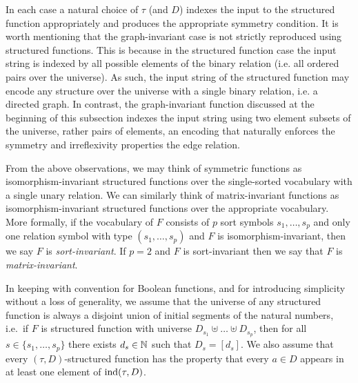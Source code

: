\documentclass[../paper.tex]{subfiles}
\begin{document}
In each case a natural choice of $\tau$ (and $D$) indexes the input to the
structured function appropriately and produces the appropriate symmetry
condition. It is worth mentioning that the graph-invariant case is not strictly
reproduced using structured functions. This is because in the structured
function case the input string is indexed by all possible elements of the binary
relation (i.e. all ordered pairs over the universe). As such, the input string
of the structured function may encode any structure over the universe with a
single binary relation, i.e. a directed graph. In contrast, the graph-invariant
function discussed at the beginning of this subsection indexes the input string
using two element subsets of the universe, rather pairs of elements, an encoding
that naturally enforces the symmetry and irreflexivity properties the edge
relation.




From the above observations, we may think of symmetric functions as
isomorphism-invariant structured functions over the single-sorted vocabulary
with a single unary relation. We can similarly think of matrix-invariant
functions as isomorphism-invariant structured functions over the appropriate
vocabulary. More formally, if the vocabulary of $F$ consists of $p$ sort symbols
$s_1, \ldots , s_p$ and only one relation symbol with type $(s_1, \ldots, s_p)$
and $F$ is isomorphism-invariant, then we say $F$ is \emph{sort-invariant}. If
$p = 2$ and $F$ is sort-invariant then we say that $F$ is
\emph{matrix-invariant}.

In keeping with convention for Boolean functions, and for introducing simplicity
without a loss of generality, we assume that the universe of any structured
function is always a disjoint union of initial segments of the natural numbers,
i.e.\ if $F$ is structured function with universe $D_{s_1} \uplus \ldots \uplus
D_{s_p}$, then for all $s \in \{s_1 , \ldots , s_p\}$ there exists $d_s \in
\mathbb{N}$ such that $D_{s} = [d_s]$. We also assume that every $(\tau,
D)$-structured function has the property that every $a \in D$ appears in at
least one element of $\text{\upshape ind}(\tau, D)$.
\end{document}
